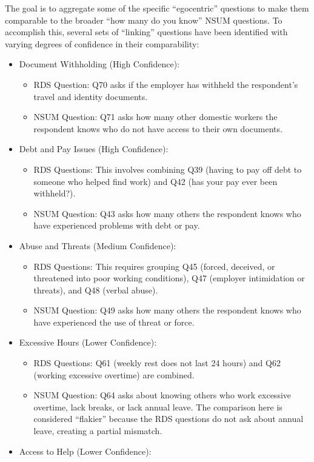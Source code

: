 \documentclass[
  12pt,
  letterpaper,
  DIV=11,
  numbers=noendperiod]{scrartcl}
\providecommand{\tightlist}{%
  \setlength{\itemsep}{0pt}\setlength{\parskip}{0pt}}
\theoremstyle{plain}
\theoremstyle{definition}
\begin{document}
The goal is to aggregate some of the specific ``egocentric'' questions
to make them comparable to the broader ``how many do you know'' NSUM
questions. To accomplish this, several sets of ``linking'' questions
have been identified with varying degrees of confidence in their
comparability:

\begin{itemize}
\tightlist
\item
  Document Withholding (High Confidence):

  \begin{itemize}
  \tightlist
  \item
    RDS Question: Q70 asks if the employer has withheld the respondent's
    travel and identity documents.
  \item
    NSUM Question: Q71 asks how many other domestic workers the
    respondent knows who do not have access to their own documents.
  \end{itemize}
\item
  Debt and Pay Issues (High Confidence):

  \begin{itemize}
  \tightlist
  \item
    RDS Questions: This involves combining Q39 (having to pay off debt
    to someone who helped find work) and Q42 (has your pay ever been
    withheld?).
  \item
    NSUM Question: Q43 asks how many others the respondent knows who
    have experienced problems with debt or pay.
  \end{itemize}
\item
  Abuse and Threats (Medium Confidence):

  \begin{itemize}
  \tightlist
  \item
    RDS Questions: This requires grouping Q45 (forced, deceived, or
    threatened into poor working conditions), Q47 (employer intimidation
    or threats), and Q48 (verbal abuse).
  \item
    NSUM Question: Q49 asks how many others the respondent knows who
    have experienced the use of threat or force.
  \end{itemize}
\item
  Excessive Hours (Lower Confidence):

  \begin{itemize}
  \tightlist
  \item
    RDS Questions: Q61 (weekly rest does not last 24 hours) and Q62
    (working excessive overtime) are combined.
  \item
    NSUM Question: Q64 asks about knowing others who work excessive
    overtime, lack breaks, or lack annual leave. The comparison here is
    considered ``flakier'' because the RDS questions do not ask about
    annual leave, creating a partial mismatch.
  \end{itemize}
\item
  Access to Help (Lower Confidence):


\end{itemize}
\end{document}
